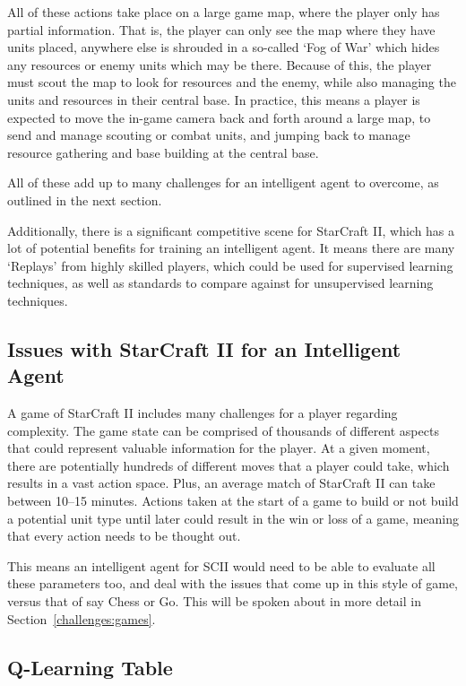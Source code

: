 All of these actions take place on a large game map, where the player only has
partial information. That is, the player can only see the map where they have
units placed, anywhere else is shrouded in a so-called `Fog of War' which hides
any resources or enemy units which may be there. Because of this, the player
must scout the map to look for resources and the enemy, while also managing the
units and resources in their central base. In practice, this means a player is
expected to move the in-game camera back and forth around a large map, to send
and manage scouting or combat units, and jumping back to manage resource
gathering and base building at the central base.

All of these add up to many challenges for an intelligent agent to
overcome, as outlined in the next section.

Additionally, there is a significant competitive scene for StarCraft
II\cite{scIIprof}, which has a lot of potential benefits for training an
intelligent agent. It means there are many `Replays' from highly
skilled players, which could be used for supervised learning techniques, as well
as standards to compare against for unsupervised learning techniques.

\subsection{Issues with StarCraft II for an Intelligent Agent}

A game of StarCraft II includes many challenges for a player regarding
complexity. The game state can be comprised of thousands of different aspects
that could represent valuable information for the player. At a given moment,
there are potentially hundreds of different moves that a player could take,
which results in a vast action space. Plus, an average match of StarCraft II can
take between 10--15 minutes. Actions taken at the start of a game to build or
not build a potential unit type until later could result in the win or loss of a
game, meaning that every action needs to be thought out.

This means an intelligent agent for SCII would need to be able to evaluate all
these parameters too, and deal with the issues that come up in this style of
game, versus that of say Chess or Go. This will be spoken about in more detail
in Section~\ref{challenges:games}.

\subsection{Q-Learning Table}

